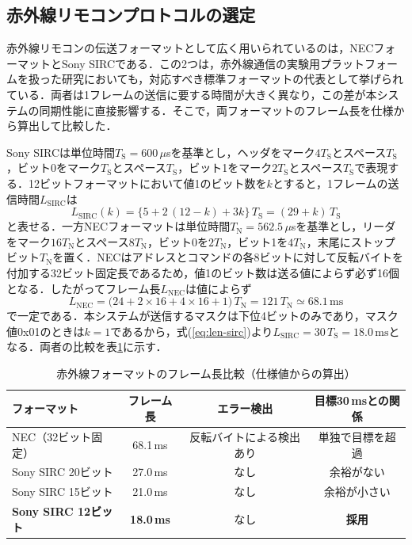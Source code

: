 \documentclass[uplatex,dvipdfmx]{jlreq}
\begin{document}
\subsection{赤外線リモコンプロトコルの選定}
\label{sec:proto-compare}

赤外線リモコンの伝送フォーマットとして広く用いられているのは，NECフォーマット\cite{necfmt}とSony SIRC\cite{sircfmt}である．この2つは，赤外線通信の実験用プラットフォームを扱った研究においても，対応すべき標準フォーマットの代表として挙げられている\cite{blanco2026}．両者は1フレームの送信に要する時間が大きく異なり，この差が本システムの同期性能に直接影響する．そこで，両フォーマットのフレーム長を仕様から算出して比較した．

Sony SIRCは単位時間$T_\mathrm{S}=600\,\mu$sを基準とし，ヘッダをマーク$4T_\mathrm{S}$とスペース$T_\mathrm{S}$，ビット0をマーク$T_\mathrm{S}$とスペース$T_\mathrm{S}$，ビット1をマーク$2T_\mathrm{S}$とスペース$T_\mathrm{S}$で表現する\cite{sircfmt}．12ビットフォーマットにおいて値1のビット数を$k$とすると，1フレームの送信時間$L_\mathrm{SIRC}$は
\begin{equation}
L_\mathrm{SIRC}(k) = \bigl\{5 + 2\,(12-k) + 3k \bigr\}\,T_\mathrm{S} = (29+k)\,T_\mathrm{S}
\label{eq:len-sirc}
\end{equation}
と表せる．一方NECフォーマットは単位時間$T_\mathrm{N}=562.5\,\mu$sを基準とし，リーダをマーク$16T_\mathrm{N}$とスペース$8T_\mathrm{N}$，ビット0を$2T_\mathrm{N}$，ビット1を$4T_\mathrm{N}$，末尾にストップビット$T_\mathrm{N}$を置く\cite{necfmt}．NECはアドレスとコマンドの各8ビットに対して反転バイトを付加する32ビット固定長であるため，値1のビット数は送る値によらず必ず16個となる．したがってフレーム長$L_\mathrm{NEC}$は値によらず
\begin{equation}
L_\mathrm{NEC} = \bigl( 24 + 2 \times 16 + 4 \times 16 + 1 \bigr)\,T_\mathrm{N} = 121\,T_\mathrm{N} \simeq 68.1\,\mathrm{ms}
\label{eq:len-nec}
\end{equation}
で一定である．本システムが送信するマスクは下位4ビットのみであり，マスク値0x01のときは$k=1$であるから，式(\ref{eq:len-sirc})より$L_\mathrm{SIRC}=30\,T_\mathrm{S}=18.0\,\mathrm{ms}$となる．両者の比較を表\ref{tab:proto-compare}に示す．

\begin{table}[tb]
\caption{赤外線フォーマットのフレーム長比較（仕様値からの算出）}
\label{tab:proto-compare}
\begin{center}
\small
\begin{tabular}{lccc}
\hline
フォーマット & フレーム長 & エラー検出 & 目標30\,msとの関係 \\
\hline
NEC（32ビット固定） & 68.1\,ms & 反転バイトによる検出あり & 単独で目標を超過 \\
Sony SIRC 20ビット & 27.0\,ms & なし & 余裕がない \\
Sony SIRC 15ビット & 21.0\,ms & なし & 余裕が小さい \\
\textbf{Sony SIRC 12ビット} & \textbf{18.0\,ms} & なし & \textbf{採用} \\
\hline
\end{tabular}
\end{center}
\end{table}
\end{document}
